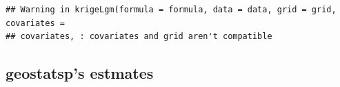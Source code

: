 \documentclass[
]{article}
\newenvironment{Shaded}{\begin{snugshade}}{\end{snugshade}}
\newcommand{\FunctionTok}[1]{\textcolor[rgb]{0.13,0.29,0.53}{\textbf{#1}}}
\newcommand{\NormalTok}[1]{#1}
\newcommand{\SpecialCharTok}[1]{\textcolor[rgb]{0.81,0.36,0.00}{\textbf{#1}}}
\newcommand{\StringTok}[1]{\textcolor[rgb]{0.31,0.60,0.02}{#1}}
\begin{document}
\begin{verbatim}
## Warning in krigeLgm(formula = formula, data = data, grid = grid, covariates =
## covariates, : covariates and grid aren't compatible
\end{verbatim}

\hypertarget{geostatsps-estmates}{%
\subsection{geostatsp's estmates}\label{geostatsps-estmates}}

\begin{Shaded}
\end{Shaded}
\end{document}
